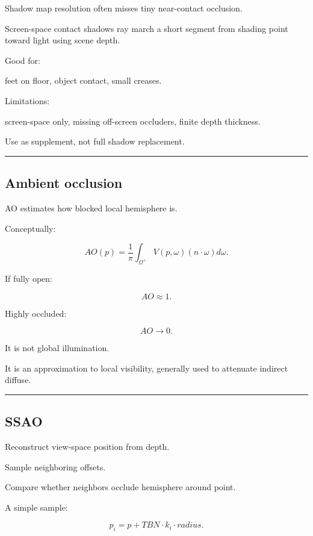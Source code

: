 Shadow map resolution often misses tiny near-contact occlusion.

Screen-space contact shadows ray march a short segment from shading point toward light using scene depth.

Good for:

feet on floor, object contact, small creases.

Limitations:

screen-space only, missing off-screen occluders, finite depth thickness.

Use as supplement, not full shadow replacement.

\begin{center}\rule{0.5\linewidth}{0.5pt}\end{center}

\subsection{Ambient occlusion}\label{04-visual-computing-ii-ch040-ambient-occlusion}

AO estimates how blocked local hemisphere is.

Conceptually:

\[
\boxed{
AO(p)
=
\frac1\pi
\int_{\Omega^+}
V(p,\omega)
(n\cdot\omega)
d\omega.
}
\]

If fully open:

\[
AO\approx1.
\]

Highly occluded:

\[
AO\rightarrow0.
\]

It is not global illumination.

It is an approximation to local visibility, generally used to attenuate indirect diffuse.

\begin{center}\rule{0.5\linewidth}{0.5pt}\end{center}

\subsection{SSAO}\label{04-visual-computing-ii-ch040-ssao}

Reconstruct view-space position from depth.

Sample neighboring offsets.

Compare whether neighbors occlude hemisphere around point.

A simple sample:

\[
p_i=
p+
TBN\cdot k_i\cdot radius.
\]

